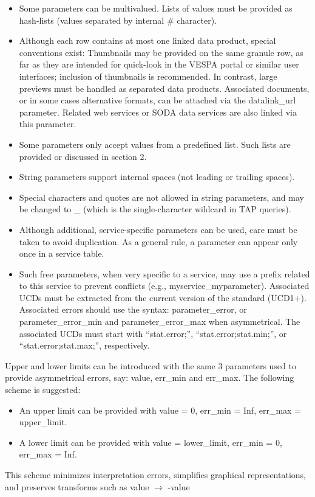 \documentclass[11pt,a4paper]{ivoa}
\begin{document}
\begin{itemize}
\begin{itemize}
\item Some parameters can be multivalued. Lists of values must be provided as hash-lists (values separated by internal \# character).

\item Although each row contains at most one linked data product, special conventions exist: 
Thumbnails may be provided on the same granule row, as far as they are intended for quick-look in the VESPA portal or similar user interfaces; inclusion of thumbnails is recommended. In contrast, large previews must be handled as separated data products.
Associated documents, or in some cases alternative formats, can be attached via the datalink\_url parameter. Related web services or SODA data services are also linked via this parameter.

\item Some parameters only accept values from a predefined list. Such lists are provided or discussed in section 2.

\item String parameters support internal spaces (not leading or trailing spaces).

\item Special characters and quotes are not allowed in string parameters, and may be changed to \_ (which is the single-character wildcard in TAP queries). 

\item Although additional, service-specific parameters can be used, care must be taken to avoid duplication. As a general rule, a parameter can appear only once in a service table.

\item Such free parameters, when very specific to a service, may use a prefix related to this service to prevent conflicts (e.g., myservice\_myparameter). Associated UCDs must be extracted from the current version of the standard (UCD1+).
Associated errors should use the syntax: parameter\_error, or parameter\_error\_min and parameter\_error\_max when asymmetrical. The associated UCDs must start with ``stat.error;'', ``stat.error;stat.min;'', or ``stat.error;stat.max;'', respectively.
\end{itemize}

Upper and lower limits can be introduced with the same 3 parameters used to provide asymmetrical errors, say: value, err\_min and err\_max. The following scheme is suggested: 

\begin{itemize}
\item An upper limit can be provided with value = 0, err\_min = Inf, err\_max = upper\_limit.

\item A lower limit can be provided with value = lower\_limit, err\_min = 0, err\_max = Inf.
\end{itemize}

This scheme minimizes interpretation errors, simplifies graphical representations, and preserves transforms such as value $\to$ -value


\end{itemize}
\end{document}
